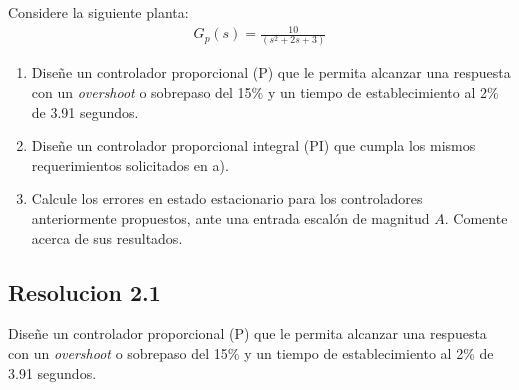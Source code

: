\documentclass[
  11pt,
  letterpaper,
   addpoints,
   answers
  ]{exam}
\begin{document}
\begin{questions}
    \question Considere la siguiente planta:
    \begin{align}
        G_{p}(s)= \frac{10}{(s^{2}+2s+3)}
    \end{align}
    \begin{enumerate}
        \item Diseñe un controlador proporcional (P) que le permita alcanzar una respuesta con un \textit{overshoot} o sobrepaso del 15\% y un tiempo de establecimiento al 2\% de 3.91 segundos.
        \item Diseñe un controlador proporcional integral (PI) que cumpla los mismos requerimientos solicitados en a).
        \item Calcule los errores en estado estacionario para los controladores anteriormente propuestos, ante una entrada escalón de magnitud $A$. Comente acerca de sus resultados.
    \end{enumerate}
    
    
\begin{solution}
\subsection*{Resolucion 2.1}
Diseñe un controlador proporcional (P) que le permita alcanzar una respuesta con un \textit{overshoot} o sobrepaso del 15\% y un tiempo de establecimiento al 2\% de 3.91 segundos.


\end{solution}
\end{questions}
\end{document}
